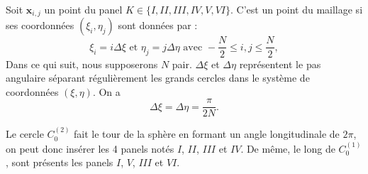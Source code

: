 Soit $\mathbf{x}_{i,j}$ un point du panel $K \in \lbrace I, II, III, IV, V, VI \rbrace$. C'est un point du maillage si ses coordonnées $(\xi_i, \eta_j)$ sont données par :
\begin{equation}
\xi_i = i \Delta \xi \text{ et } \eta_j = j \Delta \eta \text{ avec } -\dfrac{N}{2} \leq i,j \leq \dfrac{N}{2},
\end{equation}
Dans ce qui suit, nous supposerons $N$ pair. $\Delta \xi$ et $\Delta \eta$ représentent le pas angulaire séparant régulièrement les grands cercles dans le système de coordonnées $(\xi, \eta)$. On a
\begin{equation}
\Delta \xi = \Delta \eta = \dfrac{\pi}{2N}.
\end{equation} 













Le cercle $C_0^{(2)}$ fait le tour de la sphère en formant un angle longitudinale de $2 \pi$, on peut donc insérer les 4 panels notés $I$, $II$, $III$ et $IV$. De même, le long de $C_0^{(1)}$, sont présents les panels $I$, $V$, $III$ et $VI$.

